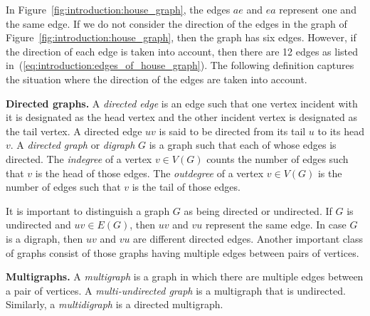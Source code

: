 In Figure~\ref{fig:introduction:house_graph}, the edges $ae$ and $ea$
represent one and the same edge. If we do not consider the direction
of the edges in the graph of
Figure~\ref{fig:introduction:house_graph}, then the graph has six
edges. However, if the direction of each edge is taken into account,
then there are 12 edges as listed
in~(\ref{eq:introduction:edges_of_house_graph}). The following
definition captures the situation where the direction of the edges are
taken into account.

\begin{definition}
\textbf{Directed graphs.}
A \emph{directed edge} is an edge such that one vertex incident with it
is designated as the head vertex and the other incident vertex is
designated as the tail vertex. A directed edge $uv$ is said to be
directed from its tail $u$ to its head $v$. A \emph{directed graph} or
\emph{digraph} $G$ is a graph such that each of whose edges is
directed. The \emph{indegree} of a vertex $v \in V(G)$ counts the
number of edges such that $v$ is the head of those edges. The
\emph{outdegree} of a vertex $v \in V(G)$ is the number of edges such
that $v$ is the tail of those edges.
\end{definition}

It is important to distinguish a graph $G$ as being directed or
undirected. If $G$ is undirected and $uv \in E(G)$, then $uv$ and $vu$
represent the same edge. In case $G$ is a digraph, then $uv$ and $vu$
are different directed edges. Another important class of graphs
consist of those graphs having multiple edges between pairs of
vertices.

\begin{definition}
\textbf{Multigraphs.}
A \emph{multigraph} is a graph in which there are multiple edges
between a pair of vertices. A \emph{multi-undirected graph} is a
multigraph that is undirected. Similarly, a \emph{multidigraph} is a
directed multigraph.
\end{definition}

